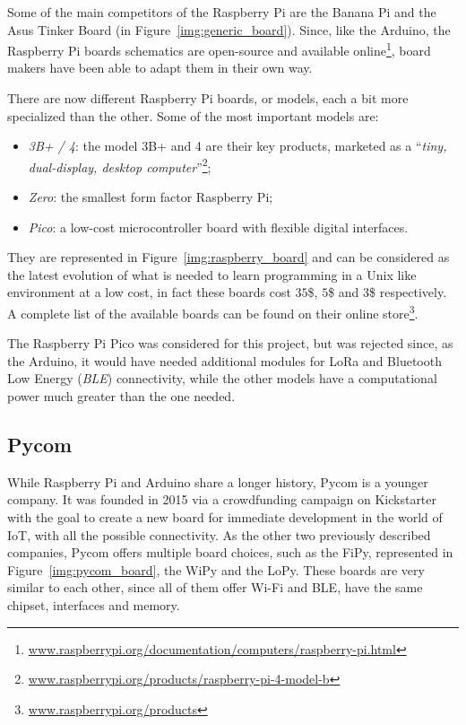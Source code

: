 			Some of the main competitors of the Raspberry Pi are the Banana Pi and the Asus Tinker Board (in Figure~\ref{img:generic_board}).
			Since, like the Arduino, the Raspberry Pi boards schematics are open-source and available online\footnote{ \url{www.raspberrypi.org/documentation/computers/raspberry-pi.html}}, board makers have been able to adapt them in their own way.
	
			There are now different Raspberry Pi boards, or models, each a bit more specialized than the other.
			Some of the most important models are:
			\begin{itemize}
				\item \textit{3B+ / 4}: the model 3B+ and 4 are their key products, marketed as a ``\textit{tiny, dual-display, desktop computer}''\footnote{ \url{www.raspberrypi.org/products/raspberry-pi-4-model-b}};
				\item \textit{Zero}: the smallest form factor Raspberry Pi;
				\item \textit{Pico}: a low-cost microcontroller board with flexible digital interfaces.
			\end{itemize}
			
			They are represented in Figure~\ref{img:raspberry_board} and can be considered as the latest evolution of what is needed to learn programming in a Unix like environment at a low cost, in fact these boards cost $35$\$, $5$\$ and $3$\$ respectively.
			A complete list of the available boards can be found on their online store\footnote{ \url{www.raspberrypi.org/products}}.
			
			The Raspberry Pi Pico was considered for this project, but was rejected since, as the Arduino, it would have needed additional modules for LoRa and Bluetooth Low Energy (\textit{BLE}) connectivity, while the other models have a computational power much greater than the one needed.
				
		\subsection{Pycom}\label{sec:pycom}
			
			While Raspberry Pi and Arduino share a longer history, Pycom is a younger company.
			It was founded in 2015 via a crowdfunding campaign on Kickstarter with the goal to create a new board for immediate development in the world of IoT, with all the possible connectivity.
			As the other two previously described companies, Pycom offers multiple board choices, such as the FiPy, represented in Figure~\ref{img:pycom_board}, the WiPy and the LoPy.
			These boards are very similar to each other, since all of them offer Wi-Fi and BLE, have the same chipset, interfaces and memory.
			

